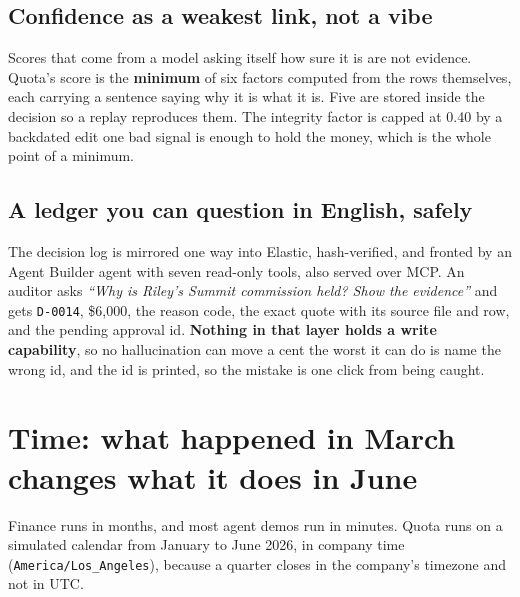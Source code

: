 \documentclass[10pt,a4paper]{article}
\newcommand{\gy}[1]{{\color{qgrey}#1}}
\newcommand{\code}[1]{{\small\texttt{#1}}}
\begin{document}
\subsection{Confidence as a weakest link, not a vibe}

Scores that come from a model asking itself how sure it is are not evidence. Quota's score is the \textbf{minimum} of six factors computed from the rows themselves, each carrying a sentence saying why it is what it is. Five are stored inside the decision so a replay reproduces them. The integrity factor is capped at 0.40 by a backdated edit \textemdash{} one bad signal is enough to hold the money, which is the whole point of a minimum.

\subsection{A ledger you can question in English, safely}

The decision log is mirrored one way into Elastic, hash-verified, and fronted by an Agent Builder agent with seven read-only tools, also served over MCP. An auditor asks \emph{``Why is Riley's Summit commission held? Show the evidence''} and gets \code{D-0014}, \$6{,}000, the reason code, the exact quote with its source file and row, and the pending approval id. \textbf{Nothing in that layer holds a write capability}, so no hallucination can move a cent \textemdash{} the worst it can do is name the wrong id, and the id is printed, so the mistake is one click from being caught.

\section{Time: what happened in March changes what it does in June}

Finance runs in months, and most agent demos run in minutes. Quota runs on a simulated calendar from January to June 2026, in company time \gy{(\code{America/Los\_Angeles})}, because a quarter closes in the company's timezone and not in UTC.
\end{document}
